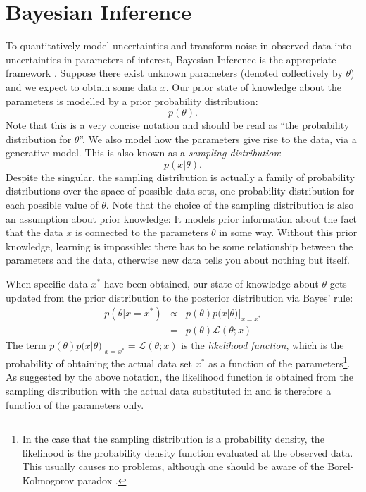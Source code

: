 \documentclass[manuscript]{aastex}
\begin{document}
\section{Bayesian Inference}
To quantitatively model uncertainties and transform noise in observed data
into uncertainties in parameters of interest, Bayesian Inference is the appropriate
framework \citep{cox, jaynes, caticha, mackay}. Suppose there exist unknown parameters
(denoted
collectively by $\theta$) and we expect to obtain some data $x$. Our prior
state of knowledge about the parameters is modelled by a prior
probability distribution:
\begin{equation}
p(\theta).
\end{equation}
Note that this is a very concise notation \citep{hogg} and should be read
as ``the probability distribution for $\theta$''.
We also model how the parameters give rise to the data, via a generative model.
This is also known as a {\it sampling distribution}:
\begin{equation}
p(x|\theta).
\end{equation}
Despite the singular, the sampling distribution is actually a family of
probability distributions over the space of possible data sets, one probability
distribution for each possible value
of $\theta$. Note that the choice of
the sampling distribution is also an assumption about prior knowledge:
It models prior information about the fact that the data $x$ is connected to
the parameters $\theta$ in some way. Without this prior knowledge, learning is
impossible: there has to be some relationship between the parameters and the
data, otherwise new data tells you about nothing but itself.

When specific data $x^*$ have been obtained, our state of knowledge about $\theta$
gets updated from the prior distribution to the posterior distribution
via Bayes' rule:
\begin{eqnarray}
p(\theta|x=x^*) &\propto& p(\theta)p(x|\theta)|_{x=x^*} \\
&=& p(\theta)\mathcal{L}(\theta; x)
\end{eqnarray}
The term $p(\theta)p(x|\theta)|_{x=x^*} = \mathcal{L}(\theta; x)$
is the {\it likelihood function}, which is the
probability of obtaining the actual data set $x^*$ as a function of the
parameters\footnote{In the case that the sampling distribution is a probability
density, the likelihood is the probability density function evaluated at the observed
data. This usually causes no problems, although one should be aware of the
Borel-Kolmogorov paradox \citep{jaynes}.}.
As suggested by the above notation, the likelihood function is obtained from the
sampling distribution with the actual data substituted in and is therefore
a function of the parameters only.
\end{document}
